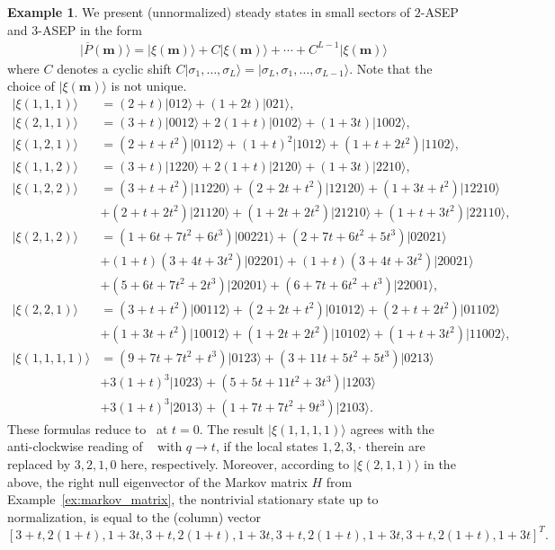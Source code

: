 \documentclass[11pt]{article}
\theoremstyle{definition}
\newtheorem{exam}[theo]{Example}
\numberwithin{equation}{section}
\newcommand{\ket}[1]{\lvert #1 \rangle}
\newcommand{\mm}{\mathbf{m}}
\begin{document}
\begin{exam}\label{ex:pbar}
We present (unnormalized) steady states in small sectors of 
$2$-ASEP and $3$-ASEP in the form
\begin{align*}
 \ket{\overline{P}(\mm)} = \ket{\xi(\mm)} + C\ket{\xi(\mm)}
 + \cdots + C^{L-1}\ket{\xi(\mm)}
 \end{align*}
 where $C$ denotes a cyclic shift 
 $C\ket{\sigma_1,\ldots, \sigma_L} = \ket{\sigma_L, \sigma_1, \ldots, \sigma_{L-1}}$.
 Note that the choice of $\ket{\xi(\mm)}$ is not unique.
\begin{align*}
\ket{\xi(1,1,1)} &= (2+t)\ket{012} + (1+2t)\ket{021},
\\
\ket{\xi(2,1,1)} &=(3+t)\ket{0012} + 2(1+t)\ket{0102}+(1+3t)\ket{1002},
\\
\ket{\xi(1,2,1)} &=(2+t+t^2)\ket{0112}+(1+t)^2\ket{1012} + (1+t+2t^2)\ket{1102},
\\
\ket{\xi(1,1,2)} &= (3+t)\ket{1220} +2(1+t) \ket{2120} + (1+3t)\ket{2210},
\\
\ket{\xi(1,2,2)} & =(3+t+t^2) \ket{11220} + (2+2t+t^2) \ket{12120} + 
(1+3t+t^2)\ket{12210} 
\\
&+ (2+t+2t^2) \ket{21120} +(1+2t+2t^2) \ket{21210} + (1+t+3t^2)\ket{22110},\\
 \ket{\xi(2,1,2)} & =(1 + 6 t + 7 t^2 + 6 t^3)\ket{ 00221} 
 + (2 + 7 t + 6 t^2 + 5 t^3) \ket{ 02021}
 \\ & + (1 + t) (3 + 4 t + 3 t^2)\ket{ 02201} 
 + (1 + t) (3 + 4 t + 3 t^2) \ket{ 20021}
 \\& + (5 + 6 t + 7 t^2 + 2 t^3) \ket{ 20201} 
 + (6 + 7 t + 6 t^2 + t^3) \ket{ 22001},\\
 \ket{\xi(2,2,1)} & =(3 + t + t^2) \ket{ 00112} + (2 + 2 t + t^2) \ket{ 01012} 
 + (2 + t + 2 t^2) \ket{ 01102}
 \\
 & + (1 + 3 t + t^2)\ket{ 10012} +(1 + 2 t + 2 t^2) \ket{10102} + 
 (1 + t + 3 t^2)\ket{ 11002},\\
%
 \ket{\xi(1,1,1,1)} & =  (9 + 7 t + 7 t^2 + t^3) \ket{0123}  
 + (3 + 11 t + 5 t^2 + 5 t^3) \ket{0213}  
 \\
& + 3 (1 + t)^3\ket{1023}  + 
 (5 + 5 t + 11 t^2 + 3 t^3) \ket{1203}  
 \\
 &+ 3 (1 + t)^3\ket{2013}  
 + (1 + 7 t + 7 t^2 + 9 t^3)\ket{2103}.
\end{align*}
These formulas reduce to~\cite[Ex.2.1]{KMO2} at $t=0$.
The result $ \ket{\xi(1,1,1,1)}$ agrees with the anti-clockwise reading of ~\cite[Fig.1.3]{Martin20} with $q\rightarrow t$, if the local states $1,2,3,\cdot$ therein are replaced by $3,2,1,0$ here, respectively.
Moreover, according to $\ket{\xi(2,1,1)}$ in the above, the right null eigenvector of the Markov matrix $H$ from Example~\ref{ex:markov_matrix}, the nontrivial stationary state up to normalization, is equal to the (column) vector
\[
[3 + t, 2 (1 + t), 1 + 3 t, 3 + t, 2 (1 + t), 1 + 3 t, 3 + t, 2 (1 + t), 1 + 3 t, 3 + t, 2 (1 + t), 1 + 3 t]^T.
\]
 
\end{exam}
\end{document}
